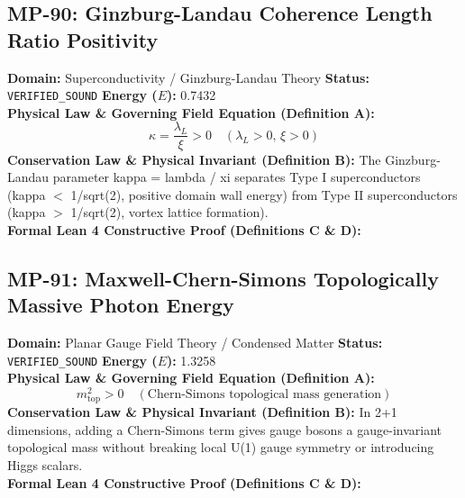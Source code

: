 \subsection{MP-90: Ginzburg-Landau Coherence Length Ratio Positivity}
\textbf{Domain:} Superconductivity / Ginzburg-Landau Theory \hfill \textbf{Status:} \texttt{VERIFIED\_SOUND} \hfill \textbf{Energy ($E$):} 0.7432\\
\textbf{Physical Law \& Governing Field Equation (Definition A):}
\begin{equation*}
\kappa = \frac{\lambda_L}{\xi} > 0 \quad (\lambda_L > 0, \, \xi > 0)
\end{equation*}
\textbf{Conservation Law \& Physical Invariant (Definition B):}
The Ginzburg-Landau parameter kappa = lambda / xi separates Type I superconductors (kappa $<$ 1/sqrt(2), positive domain wall energy) from Type II superconductors (kappa $>$ 1/sqrt(2), vortex lattice formation).\\

\textbf{Formal Lean 4 Constructive Proof (Definitions C \& D):}


\vspace{1em}
\subsection{MP-91: Maxwell-Chern-Simons Topologically Massive Photon Energy}
\textbf{Domain:} Planar Gauge Field Theory / Condensed Matter \hfill \textbf{Status:} \texttt{VERIFIED\_SOUND} \hfill \textbf{Energy ($E$):} 1.3258\\
\textbf{Physical Law \& Governing Field Equation (Definition A):}
\begin{equation*}
m_{\text{top}}^2 > 0 \quad (\text{Chern-Simons topological mass generation})
\end{equation*}
\textbf{Conservation Law \& Physical Invariant (Definition B):}
In 2+1 dimensions, adding a Chern-Simons term gives gauge bosons a gauge-invariant topological mass without breaking local U(1) gauge symmetry or introducing Higgs scalars.\\

\textbf{Formal Lean 4 Constructive Proof (Definitions C \& D):}


\vspace{1em}
